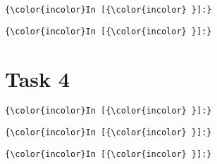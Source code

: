 \documentclass[11pt]{article}
\begin{document}
    \begin{Verbatim}[commandchars=\\\{\}]
{\color{incolor}In [{\color{incolor} }]:} 
\end{Verbatim}

    \begin{Verbatim}[commandchars=\\\{\}]
{\color{incolor}In [{\color{incolor} }]:} 
\end{Verbatim}

    \section{Task 4}\label{task-4}

    \begin{Verbatim}[commandchars=\\\{\}]
{\color{incolor}In [{\color{incolor} }]:} 
\end{Verbatim}

    \begin{Verbatim}[commandchars=\\\{\}]
{\color{incolor}In [{\color{incolor} }]:} 
\end{Verbatim}

    \begin{Verbatim}[commandchars=\\\{\}]
{\color{incolor}In [{\color{incolor} }]:} 
\end{Verbatim}
\end{document}
